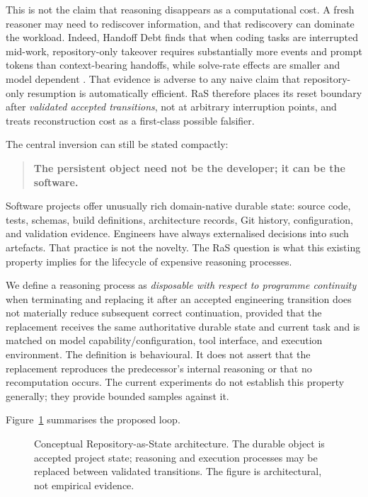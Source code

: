 This is not the claim that reasoning disappears as a computational cost. A fresh reasoner may need to rediscover information, and that rediscovery can dominate the workload. Indeed, Handoff Debt finds that when coding tasks are interrupted mid-work, repository-only takeover requires substantially more events and prompt tokens than context-bearing handoffs, while solve-rate effects are smaller and model dependent \citep{kc2026handoff}. That evidence is adverse to any naive claim that repository-only resumption is automatically efficient. RaS therefore places its reset boundary after \emph{validated accepted transitions}, not at arbitrary interruption points, and treats reconstruction cost as a first-class possible falsifier.

The central inversion can still be stated compactly:

\begin{quote}
\textbf{The persistent object need not be the developer; it can be the software.}
\end{quote}

Software projects offer unusually rich domain-native durable state: source code, tests, schemas, build definitions, architecture records, Git history, configuration, and validation evidence. Engineers have always externalised decisions into such artefacts. That practice is not the novelty. The RaS question is what this existing property implies for the lifecycle of expensive reasoning processes.

We define a reasoning process as \emph{disposable with respect to programme continuity} when terminating and replacing it after an accepted engineering transition does not materially reduce subsequent correct continuation, provided that the replacement receives the same authoritative durable state and current task and is matched on model capability/configuration, tool interface, and execution environment. The definition is behavioural. It does not assert that the replacement reproduces the predecessor's internal reasoning or that no recomputation occurs. The current experiments do not establish this property generally; they provide bounded samples against it.

Figure~\ref{fig:ras-architecture} summarises the proposed loop.

\begin{figure}[htbp]
\centering

\caption{Conceptual Repository-as-State architecture. The durable object is accepted project state; reasoning and execution processes may be replaced between validated transitions. The figure is architectural, not empirical evidence.}
\label{fig:ras-architecture}
\end{figure}

